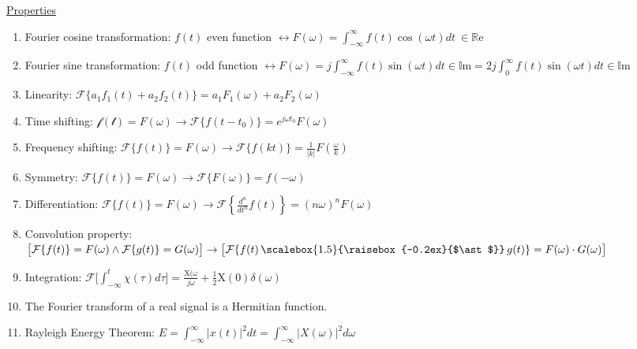 \documentclass[12pt]{article}
\newcommand{\Chi}{\mathrm{X}} %
\newcommand{\Conv}{\mathop{\scalebox{1.5}{\raisebox{-0.2ex}{$\ast$}}}} %
\begin{document}
\begin{flushleft}
	\uline{Properties}  
	\begin{enumerate}
	\item Fourier cosine transformation: $f(t)$ even function $\displaystyle \leftrightarrow F(\omega) = \int_{-\infty}^{\infty} f(t) \cos (\omega t) dt \ \in \mathbb{R}\text{e}$ 
	\item Fourier sine transformation: $f(t)$ odd function $\displaystyle \leftrightarrow F(\omega) = j \int_{-\infty}^{\infty} f(t) \sin (\omega t) dt \in \mathbb{I}\text{m} = 2j \int_0^{\infty} f(t) \sin (\omega t) dt \in \mathbb{I}\text{m}$ \linebreak 
	\item Linearity: $\displaystyle \mathcal{F} \{a_1 f_1(t) + a_2 f_2 (t) \} = a_1 F_1(\omega) + a_2 F_2(\omega) $ 
	\item Time shifting: $\displaystyle \mathcal{f(t)} = F(\omega) \rightarrow \mathcal{F} \{f(t-t_0) \} = e^{j\omega t_0} F(\omega)$ 
	\item Frequency shifting: $\displaystyle \mathcal{F} \{ f(t) \} = F(\omega) \rightarrow \mathcal{F} \{ f(kt) \} = \frac{1}{|k|} F\left( \frac{\omega}{k} \right) $ 
	\item Symmetry: $\displaystyle \mathcal{F} \{ f(t) \} = F(\omega) \rightarrow \mathcal{F} \{ F(\omega) \} = f(-\omega) $
	\item Differentiation: $\displaystyle \mathcal{F} \{ f(t) \} = F(\omega) \rightarrow \mathcal{F} \left\{ \frac{d^n}{dt^n} f(t) \right\} = (n\omega)^n F(\omega) $ 
	\item Convolution property: $\displaystyle \big[ \mathcal{F} \{f(t) \} = F(\omega) \land \mathcal{F}\{ g(t) \} = G(\omega) \big] \rightarrow \big[ \mathcal{F} \{ f(t) \Conv g(t) \} = F(\omega) \cdot G(\omega) \big] $ 
	\item Integration: $\displaystyle \mathcal{F} \big[ \int_{-\infty}^t \chi (\tau) d \tau \big] = \frac{\Chi (\omega}{j\omega} + \frac{1}{2} \Chi(0) \delta (\omega) $ 
	\item The Fourier transform of a real signal is a Hermitian function. 
	\item Rayleigh Energy Theorem: $\displaystyle E = \int_{-\infty}^{\infty} | x(t)|^2 dt = \int_{-\infty}^{\infty} |X(\omega)|^2 d\omega$ 
	\end{enumerate} 
	

\end{flushleft}
\end{document}
